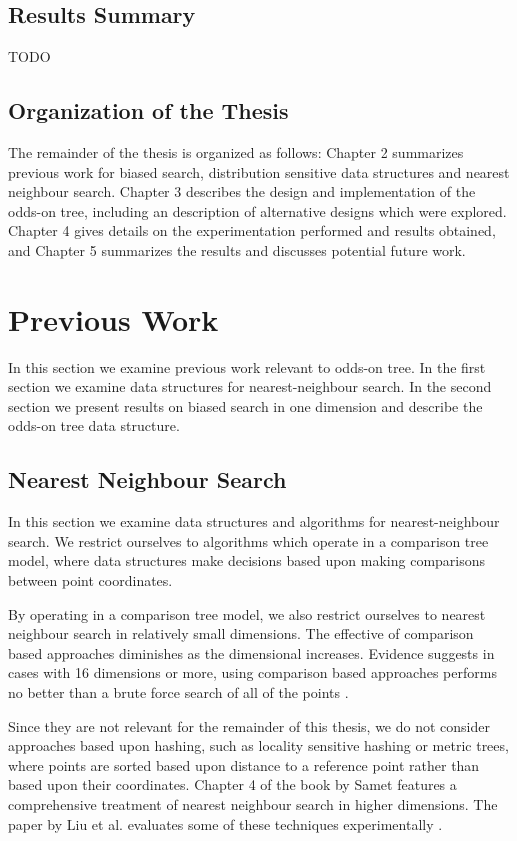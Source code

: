 \documentclass[mcs]{scsthesis}
\begin{document}
\section{Results Summary}

TODO

\section{Organization of the Thesis}

The remainder of the thesis is organized as follows: Chapter 2 summarizes
previous work for biased search, distribution sensitive data structures and
nearest neighbour search.  Chapter 3 describes the design and implementation of
the odds-on tree, including an description of alternative designs which were
explored.  Chapter 4 gives details on the experimentation performed and results
obtained, and Chapter 5 summarizes the results and discusses potential 
future work.

\chapter{Previous Work}

In this section we examine previous work relevant to odds-on tree. In the first
section we examine data structures for nearest-neighbour search. In the second
section we present results on biased search in one dimension and describe
the odds-on tree data structure.

\section{Nearest Neighbour Search}

In this section we examine data structures and algorithms for nearest-neighbour
search. We restrict ourselves to algorithms which operate in a comparison tree
model, where data structures make decisions based upon making comparisons
between point coordinates.

By operating in a comparison tree model, we also restrict ourselves to nearest
neighbour search in relatively small dimensions. The effective of comparison
based approaches diminishes as the dimensional increases. Evidence suggests in
cases with 16 dimensions or more, using comparison based approaches performs no
better than a brute force search of all of the points \cite{fastvector}.

Since they are not relevant for the remainder of this thesis, we do not consider
approaches based upon hashing, such as locality sensitive hashing \cite{lsh}
or metric trees, where points are sorted based upon distance to a reference
point rather than based upon their coordinates. Chapter 4 of the book by Samet
\cite{samet} features a comprehensive treatment of nearest neighbour search in
higher dimensions. The paper by Liu et al. evaluates some of these techniques
experimentally \cite{practicalann}. 
\end{document}
